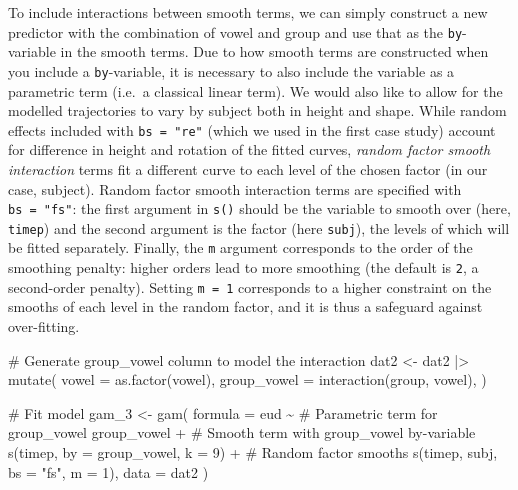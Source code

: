 \documentclass[
  letterpaper,
  DIV=11,
  numbers=noendperiod]{scrartcl}
\newenvironment{Shaded}{\begin{snugshade}}{\end{snugshade}}
\newcommand{\AttributeTok}[1]{\textcolor[rgb]{0.40,0.45,0.13}{#1}}
\newcommand{\CommentTok}[1]{\textcolor[rgb]{0.37,0.37,0.37}{#1}}
\newcommand{\DecValTok}[1]{\textcolor[rgb]{0.68,0.00,0.00}{#1}}
\newcommand{\FunctionTok}[1]{\textcolor[rgb]{0.28,0.35,0.67}{#1}}
\newcommand{\NormalTok}[1]{\textcolor[rgb]{0.00,0.23,0.31}{#1}}
\newcommand{\OtherTok}[1]{\textcolor[rgb]{0.00,0.23,0.31}{#1}}
\newcommand{\SpecialCharTok}[1]{\textcolor[rgb]{0.37,0.37,0.37}{#1}}
\newcommand{\StringTok}[1]{\textcolor[rgb]{0.13,0.47,0.30}{#1}}
\begin{document}
To include interactions between smooth terms, we can simply construct a
new predictor with the combination of vowel and group and use that as
the \texttt{by}-variable in the smooth terms. Due to how smooth terms
are constructed when you include a \texttt{by}-variable, it is necessary
to also include the variable as a parametric term (i.e.~a classical
linear term). We would also like to allow for the modelled trajectories
to vary by subject both in height and shape. While random effects
included with \texttt{bs\ =\ "re"} (which we used in the first case
study) account for difference in height and rotation of the fitted
curves, \emph{random factor smooth interaction} terms fit a different
curve to each level of the chosen factor (in our case, subject). Random
factor smooth interaction terms are specified with \texttt{bs\ =\ "fs"}:
the first argument in \texttt{s()} should be the variable to smooth over
(here, \texttt{timep}) and the second argument is the factor (here
\texttt{subj}), the levels of which will be fitted separately. Finally,
the \texttt{m} argument corresponds to the order of the smoothing
penalty: higher orders lead to more smoothing (the default is
\texttt{2}, a second-order penalty). Setting \texttt{m\ =\ 1}
corresponds to a higher constraint on the smooths of each level in the
random factor, and it is thus a safeguard against over-fitting.

\begin{Shaded}
\begin{Highlighting}[]
\CommentTok{\# Generate group\_vowel column to model the interaction}
\NormalTok{dat2 }\OtherTok{\textless{}{-}}\NormalTok{ dat2 }\SpecialCharTok{|\textgreater{}}
  \FunctionTok{mutate}\NormalTok{(}
    \AttributeTok{vowel =} \FunctionTok{as.factor}\NormalTok{(vowel),}
    \AttributeTok{group\_vowel =} \FunctionTok{interaction}\NormalTok{(group, vowel),}
\NormalTok{  )}
\end{Highlighting}
\end{Shaded}

\begin{Shaded}
\begin{Highlighting}[]
\CommentTok{\# Fit model}
\NormalTok{gam\_3 }\OtherTok{\textless{}{-}} \FunctionTok{gam}\NormalTok{(}
  \AttributeTok{formula =}\NormalTok{ eud }\SpecialCharTok{\textasciitilde{}}
    \CommentTok{\# Parametric term for group\_vowel}
\NormalTok{    group\_vowel }\SpecialCharTok{+}
    \CommentTok{\# Smooth term with group\_vowel by{-}variable}
    \FunctionTok{s}\NormalTok{(timep, }\AttributeTok{by =}\NormalTok{ group\_vowel, }\AttributeTok{k =} \DecValTok{9}\NormalTok{) }\SpecialCharTok{+}
    \CommentTok{\# Random factor smooths}
    \FunctionTok{s}\NormalTok{(timep, subj, }\AttributeTok{bs =} \StringTok{"fs"}\NormalTok{, }\AttributeTok{m =} \DecValTok{1}\NormalTok{),}
  \AttributeTok{data =}\NormalTok{ dat2}
\NormalTok{)}
\end{Highlighting}
\end{Shaded}
\end{document}
